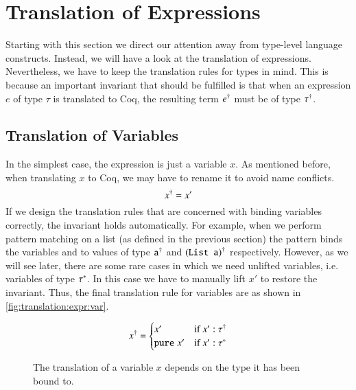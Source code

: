 \section{Translation of Expressions} \label{sec:translation:expr}
Starting with this section we direct our attention away from type-level language constructs.
Instead, we will have a look at the translation of expressions.
Nevertheless, we have to keep the translation rules for types in mind.
This is because an important invariant that should be fulfilled is that when an expression $e$ of type $\tau$ is translated to Coq, the resulting term ${e}^{\dagger}$ must be of type ${\tau}^{\dagger}$.

\subsection{Translation of Variables} \label{sec:translation:expr:vars}
In the simplest case, the expression is just a variable $x$.
As mentioned before, when translating $x$ to Coq, we may have to rename it to avoid name conflicts.
\[
  {x}^{\dagger} = x'
\]
If we design the translation rules that are concerned with binding variables correctly, the invariant holds automatically.
For example, when we perform pattern matching on a list (as defined in the previous section) the pattern  binds the variables  and  to values of type ${\texttt{a}}^{\dagger}$ and ${(\texttt{List a})}^{\dagger}$ respectively.
However, as we will see later, there are some rare cases in which we need unlifted variables, i.e. variables of type ${\tau}^{*}$.
In this case we have to manually lift $x'$ to restore the invariant.
Thus, the final translation rule for variables are as shown in \autoref{fig:translation:expr:var}.

\begin{figure}[H]
  \[
    {x}^{\dagger} = \begin{cases}
      x'        &\text{if } x' : {\tau}^{\dagger} \\
      \texttt{pure}\;{x'} &\text{if } x' : {\tau}^{*}
    \end{cases}
  \]
  \caption{The translation of a variable $x$ depends on the type it has been bound to.}
  \label{fig:translation:expr:var}
\end{figure}

